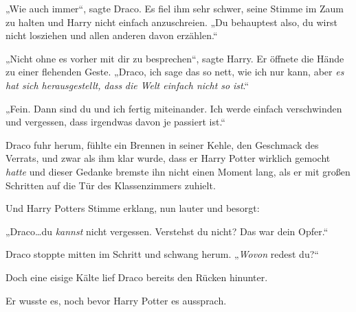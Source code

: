 „Wie auch immer“, sagte Draco. Es fiel ihm sehr schwer, seine Stimme im Zaum zu halten und Harry nicht einfach anzuschreien. „Du behauptest also, du wirst nicht losziehen und allen anderen davon erzählen.“

„Nicht ohne es vorher mit dir zu besprechen“, sagte Harry. Er öffnete die Hände zu einer flehenden Geste. „Draco, ich sage das so nett, wie ich nur kann, aber \emph{es hat sich herausgestellt,} \emph{dass} \emph{die Welt einfach nicht so} \emph{ist}.“

„Fein. Dann sind du und ich fertig miteinander. Ich werde einfach verschwinden und vergessen, dass irgendwas davon je passiert ist.“

Draco fuhr herum, fühlte ein Brennen in seiner Kehle, den Geschmack des Verrats, und zwar als ihm klar wurde, dass er Harry Potter wirklich gemocht \emph{hatte} und dieser Gedanke bremste ihn nicht einen Moment lang, als er mit großen Schritten auf die Tür des Klassenzimmers zuhielt.

Und Harry Potters Stimme erklang, nun lauter und besorgt:

„Draco…du \emph{kannst} nicht vergessen. Verstehst du nicht? Das war dein Opfer.“

Draco stoppte mitten im Schritt und schwang herum. „\emph{Wovon} redest du?“

Doch eine eisige Kälte lief Draco bereits den Rücken hinunter.

Er wusste es, noch bevor Harry Potter es aussprach.

